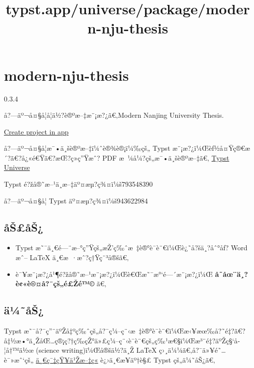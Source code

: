 \title{typst.app/universe/package/modern-nju-thesis}

\label{banner}
\label{template-thumbnail}

\section{modern-nju-thesis}\label{modern-nju-thesis}

{ 0.3.4 }

å?---äº¬å¤§å­¦å­¦ä½?è®ºæ--‡æ¨¡æ?¿ã€‚Modern Nanjing University Thesis.

\href{/app?template=modern-nju-thesis&version=0.3.4}{Create project in
app}

\label{readme}
å?---äº¬å¤§å­¦æ¯•ä¸šè®ºæ--‡ï¼ˆè®¾è®¡ï¼‰çš„ Typst
æ¨¡æ?¿ï¼Œèƒ½å¤Ÿç®€æ´?ã€?å¿«é€Ÿã€?æŒ?ç»­ç''Ÿæˆ? PDF
æ~¼å¼?çš„æ¯•ä¸šè®ºæ--‡ã€‚
\href{https://typst.app/universe/package/modern-nju-thesis}{Typst
Universe}

Typst é?žå®˜æ--¹ä¸­æ--‡äº¤æµ?ç¾¤ï¼š793548390

å?---äº¬å¤§å­¦ Typst äº¤æµ?ç¾¤ï¼š943622984


\subsection{åŠ£åŠ¿}\label{uxe5ux161uxe5ux161}

\begin{itemize}
\tightlist
\item
  Typst æ˜¯ä¸€é---¨æ--°ç''Ÿçš„æŽ'ç‰ˆæ~‡è®°è¯­è¨€ï¼Œè¿˜å?šä¸?åˆ°åƒ? Word
  æˆ-- LaTeX ä¸€æ~·æˆ?ç†Ÿç¨³å®šã€‚
\item
  è¯¥æ¨¡æ?¿å¹¶é?žå®˜æ--¹æ¨¡æ?¿ï¼Œè€Œæ˜¯æ°`é---´æ¨¡æ?¿ï¼Œ
  \textbf{å­˜åœ¨ä¸?è¢«è®¤å?¯çš„é£Žé™©} ã€‚
\end{itemize}

\subsection{ä¼˜åŠ¿}\label{uxe4uxbcuxe5ux161}

Typst
æ˜¯å?¯ç''¨äºŽå‡ºç‰ˆçš„å?¯ç¼--ç¨‹æ~‡è®°è¯­è¨€ï¼Œæ‹¥æœ‰å?˜é‡?ã€?å‡½æ•°ä¸ŽåŒ\ldots ç®¡ç?†ç­‰çŽ°ä»£ç¼--ç¨‹è¯­è¨€çš„ç‰¹æ€§ï¼Œæ³¨é‡?äºŽç§`å­¦å†™ä½œ
(science writing)ï¼Œå®šä½?ä¸Ž LaTeX ç›¸ä¼¼ã€‚å?¯ä»¥é˜\ldots è¯»æˆ`çš„
\href{https://zhuanlan.zhihu.com/p/669097092}{ä¸€ç¯‡çŸ¥ä¹Žæ--‡ç«}
è¿›ä¸€æ­¥äº†è§£ Typst çš„ä¼˜åŠ¿ã€‚

